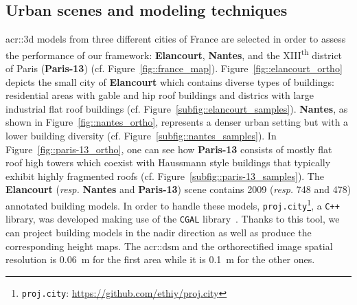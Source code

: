     \subsection{Urban scenes and modeling techniques}
        \label{subsec::experiments::datasets::scenes}        
        \gls{acr::3d} models from three different cities of France are selected in order to assess the performance of our framework: \textbf{Elancourt}, \textbf{Nantes}, and the XIII\textsuperscript{th} district of Paris (\textbf{Paris-13}) (cf. Figure~\ref{fig::france_map}).
        Figure~\ref{fig::elancourt_ortho} depicts the small city of \textbf{Elancourt} which contains diverse types of buildings: residential areas with gable and hip roof buildings and districs with large industrial flat roof buildings (cf. Figure~\ref{subfig::elancourt_samples}).
        \textbf{Nantes}, as shown in Figure~\ref{fig::nantes_ortho}, represents a denser urban setting but with a lower building diversity (cf. Figure~\ref{subfig::nantes_samples}).
        In Figure~\ref{fig::paris-13_ortho}, one can see how \textbf{Paris-13} consists of mostly flat roof high towers which coexist with Haussmann style buildings that typically exhibit highly fragmented roofs (cf. Figure~\ref{subfig::paris-13_samples}).
        The \textbf{Elancourt} (\textit{resp.} \textbf{Nantes} and \textbf{Paris-13}) scene contains \num{2009} (\textit{resp.} \num{748} and \num{478}) annotated building models.
        In order to handle these models, \verb!proj.city!\footnote{
            \verb!proj.city!: \href{https://github.com/ethiy/proj.city}{\url{https://github.com/ethiy/proj.city}}
        }, a \verb!C++! library, was developed making use of the \verb!CGAL! library~\parencite{fabri2000design}.
        Thanks to this tool, we can project building models in the nadir direction as well as produce the corresponding height maps.
        The \gls{acr::dsm} and the orthorectified image spatial resolution is \SI{0.06}{\m} for the first area while it is \SI{0.1}{\m} for the other ones.\\

